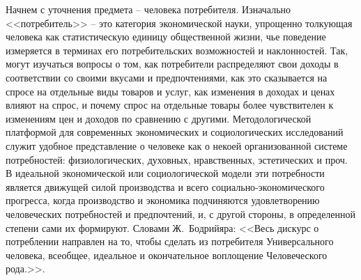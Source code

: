 Начнем с уточнения предмета -- человека потребителя. Изначально <<потребитель>> --
это категория экономической науки, упрощенно толкующая человека как
статистическую единицу общественной жизни, чье поведение измеряется в
терминах его потребительских возможностей и наклонностей. Так, могут изучаться
вопросы о том, как потребители распределяют свои доходы в соответствии со своими
вкусами и предпочтениями, как это сказывается на спросе на отдельные виды товаров
и услуг, как изменения в доходах и ценах влияют на спрос, и почему спрос на отдельные
товары более чувствителен к изменениям цен и доходов по сравнению с другими.
Методологической платформой для современных экономических и социологических
исследований служит удобное представление о человеке как о некоей организованной
системе потребностей: физиологических, духовных, нравственных, эстетических и проч.
В идеальной экономической или социологической модели эти потребности является
движущей силой производства и всего социально-экономического прогресса, когда
производство и экономика подчиняются удовлетворению человеческих потребностей
и предпочтений, и, с другой стороны, в определенной степени сами их формируют.
Словами Ж.~Бодрийяра: <<Весь дискурс о потреблении направлен на то, чтобы сделать
из потребителя Универсального человека, всеобщее, идеальное и окончательное
воплощение Человеческого рода.>>\autocite{bodriyar_society}.
\autocite{ballestrem1999}\autocite{book:bodriyar}\autocite{bunkina2000}\autocite{klein2003}
\autocite{kuli2000}\autocite{livshits2001}\autocite{markuze1994}\autocite{maslow2009}
\autocite{sibruk2005}\autocite{fukuyama2004}\autocite{alias2001}
